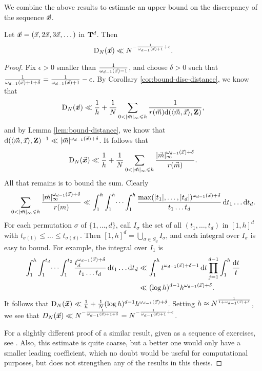 We combine the above results to estimate an upper bound on the discrepancy of 
the sequence $\vec{\boldsymbol x}$. 

\begin{theorem}\label{thm:disc-upper-bound}
Let $\vec{\boldsymbol x}=(\vec{x},2\vec{x},3\vec{x},\dots)$ in $\mathbf{T}^d$. Then 
\[
	\operatorname{D}_N(\vec{\boldsymbol x}) \ll N^{-\frac{1}{\omega_{d-1}(\vec{x})+1}+\epsilon} .
\]
\end{theorem}
\begin{proof}
Fix $\epsilon>0$ smaller than $\frac{1}{\omega_{d-1}(\vec{x}) - 1}$, and choose 
$\delta>0$ such that 
$\frac{1}{\omega_{d-1}(\vec{x})+1+\delta} = \frac{1}{\omega_{d-1}(\vec{x})+1} - \epsilon$. 
By Corollary \ref{cor:bound-disc-distance}, we know that 
\[
	\D_N(\bvx) \ll \frac 1 h + \frac 1 N \sum_{0<|\vm|_\infty \leqslant h} \frac{1}{r(\vm) \dd(\langle \vm,\vx\rangle,\bZ)} ,
\]
and by Lemma \ref{lem:bound-distance}, we know that 
$\mathrm{d}(\langle \vec{m},\vec{x}\rangle,\mathbf{Z})^{-1} \ll |\vec{m}|^{\omega_{d-1}(\vec{x})+\delta}$. 
It follows that 
\[
	\operatorname{D}_N(\vec{\boldsymbol x}) \ll \frac 1 h + \frac 1 N \sum_{0 < |\vec{m}|_\infty \leqslant h} \frac{|\vec{m}|_\infty^{\omega_{d-1}(\vec{x})+\delta}}{r(\vec{m})} .
\]
All that remains is to bound the sum. Clearly 
\[
	\sum_{0 < |\vec{m}|_\infty \leqslant h} \frac{|\vec{m}|_\infty^{\omega_{d-1}(\vec{x}) + \delta}}{r(m)} \ll \int_1^h \int_1^h \dots \int_1^h \frac{\max(|t_1|,\dots,|t_d|)^{\omega_{d-1}(\vec{x})+\delta}}{t_1 \dots t_d}\, \mathrm{d} t_1 \dots \mathrm{d} t_d .
\]
For each permutation $\sigma$ of $\{1,\dots,d\}$, call $I_\sigma$ the set of 
all $(t_1,\dots,t_d)$ in $[1,h]^d$ with 
$t_{\sigma(1)} \leqslant \dots \leqslant t_{\sigma(d)}$. Then 
$[1,h]^d = \bigcup_{\sigma\in S_d} I_\sigma$, and each integral over 
$I_\sigma$ is easy to bound. For example, the integral over $I_1$ is 
\begin{align*}
	\int_1^h \int_1^{t_d} \dots \int_1^{t_2} \frac{t_d^{\omega_{d-1}(\vec{x})+\delta}}{t_1 \dots t_d}\, \mathrm{d} t_1 \dots \mathrm{d} t_d 
		&\ll \int_1^h t^{\omega_{d-1}(\vec{x})+\delta-1}\, \mathrm{d} t \prod_{j=1}^{d-1} \int_1^h \frac{\mathrm{d} t}{t} \\
		&\ll (\log h)^{d-1} h^{\omega_{d-1}(\vec{x})+\delta} .
\end{align*}
It follows that 
$\operatorname{D}_N(\vec{\boldsymbol x}) \ll \frac 1 h + \frac 1 N (\log h)^{d-1} h^{\omega_{d-1}(\vec{x})+\delta}$. 
Setting $h\approx N^{\frac{1}{1+\omega_{d-1}(\vec{x})+\delta}}$, we see that 
$D_N(\vec{\boldsymbol x}) \ll N^{-\frac{1}{\omega_{d-1}(\vec{x})+1+\delta}} = N^{-\frac{1}{\omega_{d-1}(\vec{x})+1} + \epsilon}$. 

For a slightly different proof of a similar result, given as a sequence of 
exercises, see  \cite[Ch.~2, Ex.~3.15, 16, 17]{kuipers-niederreiter-1974}. 
Also, this estimate is quite coarse, but a better one would only have a smaller 
leading coefficient, which no doubt would be useful for computational 
purposes, but does not strengthen any of the results in this thesis.  
\end{proof}

